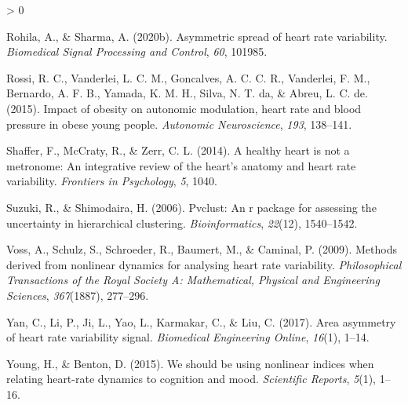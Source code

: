 \documentclass[
  english,
  jou,floatsintext]{apa6}
\newlength{\cslhangindent}
\newenvironment{CSLReferences}[2] %
 {%
  \setlength{\parindent}{0pt}
  \ifodd #1 \everypar{\setlength{\hangindent}{\cslhangindent}}\ignorespaces\fi
  \ifnum #2 > 0
  \setlength{\parskip}{#2\baselineskip}
  \fi
 }%
 {}
\begin{document}
\begin{CSLReferences}{1}{0}
\leavevmode\hypertarget{ref-rohila2020asymmetric}{}%
Rohila, A., \& Sharma, A. (2020b). Asymmetric spread of heart rate variability. \emph{Biomedical Signal Processing and Control}, \emph{60}, 101985.

\leavevmode\hypertarget{ref-rossi2015impact}{}%
Rossi, R. C., Vanderlei, L. C. M., Goncalves, A. C. C. R., Vanderlei, F. M., Bernardo, A. F. B., Yamada, K. M. H., Silva, N. T. da, \& Abreu, L. C. de. (2015). Impact of obesity on autonomic modulation, heart rate and blood pressure in obese young people. \emph{Autonomic Neuroscience}, \emph{193}, 138--141.

\leavevmode\hypertarget{ref-shaffer2014healthy}{}%
Shaffer, F., McCraty, R., \& Zerr, C. L. (2014). A healthy heart is not a metronome: An integrative review of the heart's anatomy and heart rate variability. \emph{Frontiers in Psychology}, \emph{5}, 1040.

\leavevmode\hypertarget{ref-suzuki2006pvclust}{}%
Suzuki, R., \& Shimodaira, H. (2006). Pvclust: An r package for assessing the uncertainty in hierarchical clustering. \emph{Bioinformatics}, \emph{22}(12), 1540--1542.

\leavevmode\hypertarget{ref-voss2009methods}{}%
Voss, A., Schulz, S., Schroeder, R., Baumert, M., \& Caminal, P. (2009). Methods derived from nonlinear dynamics for analysing heart rate variability. \emph{Philosophical Transactions of the Royal Society A: Mathematical, Physical and Engineering Sciences}, \emph{367}(1887), 277--296.

\leavevmode\hypertarget{ref-yan2017area}{}%
Yan, C., Li, P., Ji, L., Yao, L., Karmakar, C., \& Liu, C. (2017). Area asymmetry of heart rate variability signal. \emph{Biomedical Engineering Online}, \emph{16}(1), 1--14.

\leavevmode\hypertarget{ref-young2015we}{}%
Young, H., \& Benton, D. (2015). We should be using nonlinear indices when relating heart-rate dynamics to cognition and mood. \emph{Scientific Reports}, \emph{5}(1), 1--16.

\end{CSLReferences}

\endgroup
\end{document}

